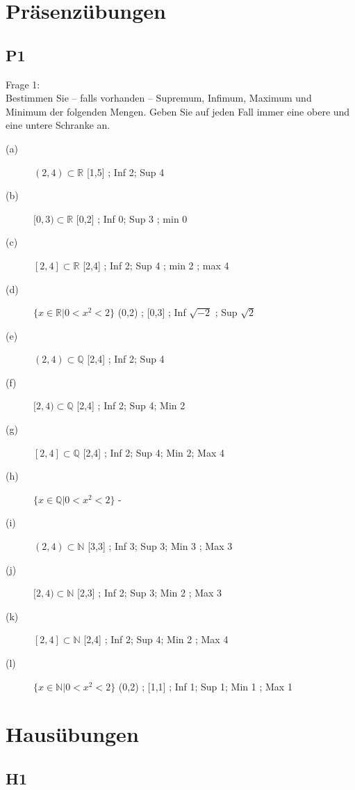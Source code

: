 \documentclass[12pt,a4paper]{article}
\begin{document}
\section{Präsenzübungen}

\subsection{P1}

Frage 1:
\\[2ex]
Bestimmen Sie – falls vorhanden – Supremum, Infimum, Maximum und Minimum der folgenden Mengen. Geben Sie auf jeden Fall immer eine obere und eine untere Schranke an.

\begin{description}
\item[(a)]{$(2,4) \subset \mathbb{R} $ [1,5] ; Inf 2; Sup 4}
\item[(b)]{$[0,3) \subset \mathbb{R} $ [0,2] ; Inf 0; Sup 3 ; min 0}
\item[(c)]{$[2,4] \subset \mathbb{R} $ [2,4] ; Inf 2; Sup 4 ; min 2 ; max 4}
\item[(d)]{$\{x \in \mathbb{R} | 0 < x^2 < 2\} $ (0,2) ; [0,3] ; Inf $\sqrt{-2}$ ; Sup $\sqrt{2}$}
\item[(e)]{$(2,4) \subset \mathbb{Q} $ [2,4] ; Inf 2; Sup 4}
\item[(f)]{$[2,4) \subset \mathbb{Q} $ [2,4] ; Inf 2; Sup 4; Min 2}
\item[(g)]{$[2,4] \subset \mathbb{Q} $ [2,4] ; Inf 2; Sup 4; Min 2; Max 4}
\item[(h)]{$\{x \in \mathbb{Q} | 0 < x^2 < 2\} $ -}
\item[(i)]{$(2,4) \subset \mathbb{N} $ [3,3] ; Inf 3; Sup 3; Min 3 ; Max 3}
\item[(j)]{$[2,4) \subset \mathbb{N} $ [2,3] ; Inf 2; Sup 3; Min 2 ; Max 3}
\item[(k)]{$[2,4] \subset \mathbb{N} $ [2,4] ; Inf 2; Sup 4; Min 2 ; Max 4}
\item[(l)]{$\{x \in \mathbb{N} | 0 < x^2 < 2\} $ (0,2) ; [1,1] ; Inf 1; Sup 1; Min 1 ; Max 1}
\end{description}

\section{Hausübungen}

\subsection{H1}
\end{document}
